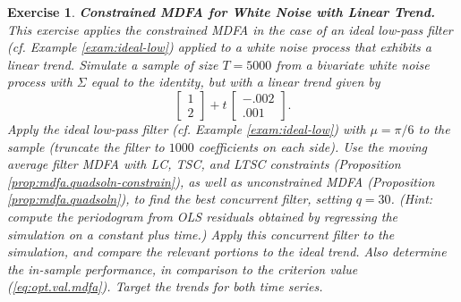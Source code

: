 \documentclass[a4paper]{book}
\newtheorem{Exercise}{Exercise}
\begin{document}
\begin{Exercise} {\bf  Constrained MDFA for White Noise with Linear Trend.} \rm
\label{exer:wntrend-mdfa}
This exercise applies the constrained MDFA in the case of an ideal low-pass filter
 (cf. Example \ref{exam:ideal-low}) 
 applied to a white noise process that exhibits a linear trend.
 Simulate a sample of size $T=5000$ from a
  bivariate white noise process with 
  $\Sigma$ equal to the identity, but with a linear trend  given by
  \begin{equation}
  \label{eq:wntrend-lin.trend}
   \left[ \begin{array}{c} 1 \\ 2 \end{array} \right] + t \, 
   \left[ \begin{array}{c} -.002 \\ .001 \end{array} \right].
  \end{equation}
   Apply the   ideal low-pass filter (cf. Example \ref{exam:ideal-low}) with 
  $\mu = \pi/6$ to the sample (truncate the filter to $1000$ coefficients on each side).  
 Use the moving average filter  MDFA  with LC, TSC, and LTSC constraints
  (Proposition \ref{prop:mdfa.quadsoln-constrain}),
  as well as unconstrained MDFA  (Proposition \ref{prop:mdfa.quadsoln}), to find the best
 concurrent filter, setting $q= 30$. 
  (Hint: compute the periodogram from OLS residuals obtained by regressing the simulation
   on a constant plus time.)
 Apply this concurrent filter 
 to the simulation, and compare the relevant portions to the ideal trend.
 Also determine the in-sample performance, in comparison to the criterion value
 (\ref{eq:opt.val.mdfa}).   Target the trends for both time series.
\end{Exercise}
\end{document}
